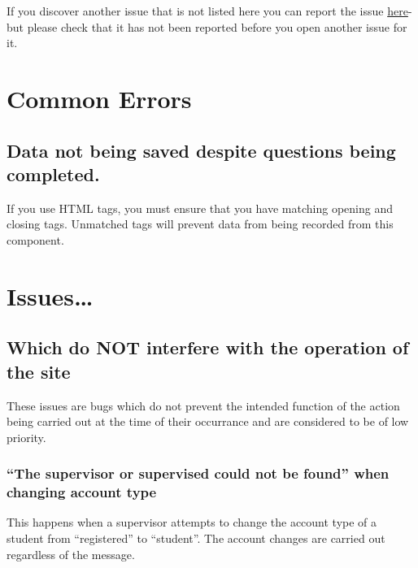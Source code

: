 \documentclass[]{book}
\begin{document}
If you discover another issue that is not listed here you can report the
issue \href{https://github.com/RebeccaJLai/exp_manual/issues}{here}- but
please check that it has not been reported before you open another issue
for it.

\section*{Common Errors}\label{common-errors}

\subsection{Data not being saved despite questions being
completed.}\label{data-not-being-saved-despite-questions-being-completed.}

If you use HTML tags, you must ensure that you have matching opening and
closing tags. Unmatched tags will prevent data from being recorded from
this component.

\section*{Issues\ldots{}}\label{issues}

\subsection*{Which do NOT interfere with the operation of the
site}\label{which-do-not-interfere-with-the-operation-of-the-site}

These issues are bugs which do not prevent the intended function of the
action being carried out at the time of their occurrance and are
considered to be of low priority.

\subsubsection*{\texorpdfstring{``The supervisor or supervised could not
be found'' when changing account
type}{The supervisor or supervised could not be found when changing account type}}\label{notfound}

This happens when a supervisor attempts to change the account type of a
student from ``registered'' to ``student''. The account changes are
carried out regardless of the message.
\end{document}
